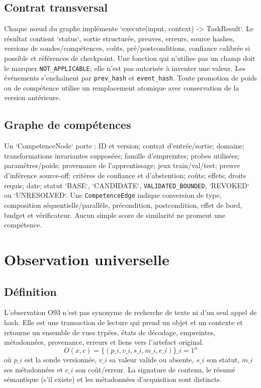 \documentclass[11pt,a4paper,oneside]{report}
\begin{document}
\section{Contrat transversal}
Chaque nœud du graphe implémente `execute(input, context) -> TaskResult`. Le résultat contient `status`, sortie structurée, preuves, erreurs, source hashes, versions de sondes/compétences, coûts, pré/postconditions, confiance calibrée si possible et références de checkpoint. Une fonction qui n'utilise pas un champ doit le marquer \texttt{NOT\_APPLICABLE}; elle n'est pas autorisée à inventer une valeur. Les événements s'enchaînent par \texttt{prev\_hash} et \texttt{event\_hash}. Toute promotion de poids ou de compétence utilise un remplacement atomique avec conservation de la version antérieure.

\section{Graphe de compétences}
Un `CompetenceNode` porte : ID et version; contrat d'entrée/sortie; domaine; transformations invariantes supposées; famille d'empreintes; probes utilisées; paramètres/poids; provenance de l'apprentissage; jeux train/val/test; preuve d'inférence source-off; critères de confiance et d'abstention; coûts; effets; droits requis; date; statut `BASE`, `CANDIDATE`, \texttt{VALIDATED\_BOUNDED}, `REVOKED` ou `UNRESOLVED`. Une \texttt{CompetenceEdge} indique conversion de type, composition séquentielle/parallèle, précondition, postcondition, effet de bord, budget et vérificateur. Aucun simple score de similarité ne promeut une compétence.

\chapter{Observation universelle}
\section{Définition}
L'observation O93 n'est pas synonyme de recherche de texte ni d'un seul appel de hash. Elle est une transaction de lecture qui prend un objet et un contexte et retourne un ensemble de vues typées, états de décodage, empreintes, métadonnées, provenance, erreurs et liens vers l'artefact original.
\[
 O(x,c)=\{(p\_i, v\_i, s\_i, m\_i, e\_i)\}\_{i=1}^{n}
\]
où $p\_i$ est la sonde versionnée, $v\_i$ sa valeur valide ou absente, $s\_i$ son statut, $m\_i$ ses métadonnées et $e\_i$ son coût/erreur. La signature de contenu, le résumé sémantique (s'il existe) et les métadonnées d'acquisition sont distincts.
\end{document}
